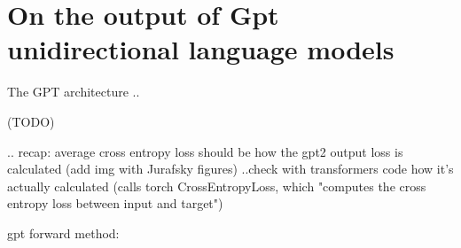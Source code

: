 \pagebreak

\section{On the output of Gpt unidirectional language models}

The GPT architecture \citep{radford2018improving} ..

(TODO)


..
recap: average cross entropy loss should be how the gpt2 output loss is calculated (add img with Jurafsky figures)
..check with transformers code how it's actually calculated
(calls torch CrossEntropyLoss, which "computes the cross entropy loss between input and target")


gpt forward method:

